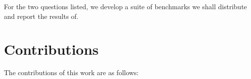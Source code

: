 For the two questions listed, we develop a suite of benchmarks we shall distribute and report the results of. 

\section{Contributions}

The contributions of this work are as follows:



